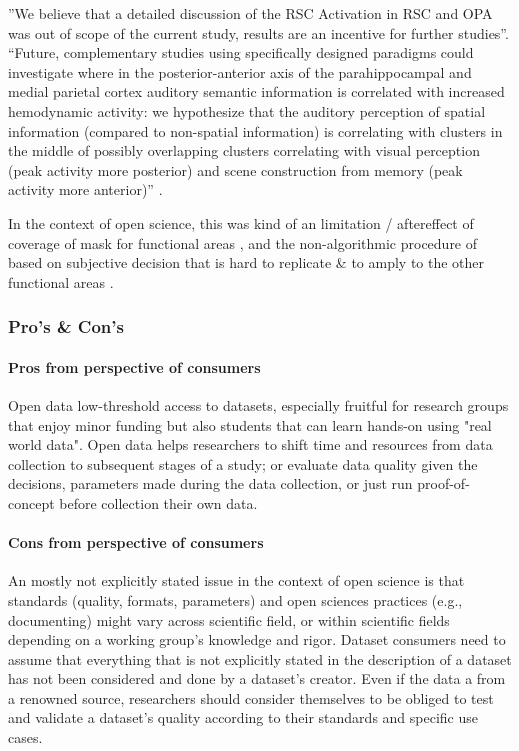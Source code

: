 %
''We believe that a detailed discussion of the RSC Activation in RSC and OPA was
out of scope of the current study, results are an incentive for further
studies''.
``Future, complementary studies using specifically designed paradigms could
investigate where in the posterior-anterior axis of the parahippocampal and
medial parietal cortex auditory semantic information is correlated with
increased hemodynamic activity:
we hypothesize that the auditory perception of spatial information (compared to
non-spatial information) is correlating with clusters in the middle of possibly
overlapping clusters correlating with visual perception (peak activity more
posterior) and scene construction from memory (peak activity more anterior)''
\citep{haeusler2022processing}.

%
In the context of open science, this was kind of an limitation / aftereffect of
coverage of mask for functional areas \citet{sengupta2016extension}, and the
non-algorithmic procedure of \citet{sengupta2016extension} based on subjective
decision that is hard to replicate \& to amply to the other functional areas
\citep[cf. algorithmic procedure in, e.g.,][]{julian2012algorithmic}.



\subsubsection{Pro's \& Con's}


\paragraph{Pros from perspective of consumers}

%
Open data low-threshold access to datasets, especially fruitful for research
groups that enjoy minor funding but also students that can learn hands-on using
"real world data".
%
Open data helps researchers to shift time and resources from data collection to
subsequent stages of a study; or evaluate data quality given the decisions,
parameters made during the data collection, or just run proof-of-concept before
collection their own data.


\paragraph{Cons from perspective of consumers}

An mostly not explicitly stated issue in the context of open science is that
standards (quality, formats, parameters) and open sciences practices (e.g.,
documenting) might vary across scientific field, or within scientific fields
depending on a working group's knowledge and rigor.
Dataset consumers need to assume that everything that is not explicitly stated
in the description of a dataset has not been considered and done by a dataset's
creator.
Even if the data a from a renowned source, researchers should consider
themselves to be obliged to test and validate a dataset's quality according to
their standards and specific use cases.



